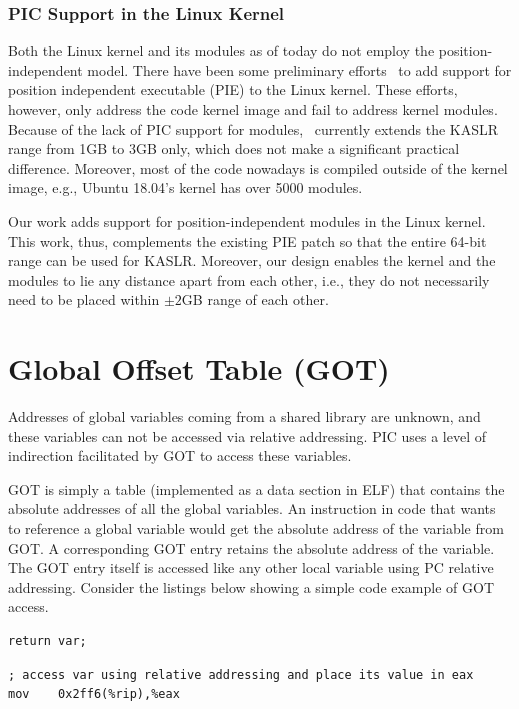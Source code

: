 \subsubsection*{PIC Support in the Linux Kernel}
Both the Linux kernel and its modules as of today do not employ the position-independent model. 
There have been some preliminary efforts~\cite{LINUXPIE} to add support for position independent executable (PIE) to the Linux kernel. These efforts, however, only address the code kernel image and fail to address kernel modules.
Because of the lack of PIC support for modules,~\cite{LINUXPIE} currently extends the KASLR range from 1GB to 3GB only, which does not make a significant practical difference.
Moreover, most of the code nowadays is compiled outside of the kernel image, e.g., Ubuntu 18.04's kernel has over 5000 modules.

Our work adds support for position-independent modules in the Linux kernel. This work, thus, complements the existing PIE patch so that the entire 64-bit range can be used for KASLR. Moreover, our design enables the kernel and the modules to lie any distance apart from each other, i.e., they do not necessarily need to be placed within $\pm 2$GB range of each other.

\section{Global Offset Table (GOT)} \label{sec:background_got}
Addresses of global variables coming from a shared library are unknown, and these variables can not be accessed via relative addressing. PIC uses a level of indirection facilitated by GOT to access these variables.

GOT is simply a table (implemented as a data section in ELF) that contains the absolute addresses of all the global variables. An instruction in code that wants to reference a global variable would get the absolute address of the variable from GOT. A corresponding GOT entry retains the absolute address of the variable. The GOT entry itself is accessed like any other local variable using PC relative addressing. Consider the listings below showing a simple code example of GOT access.
\lstset{language=C}
\begin{lstlisting}[frame=single, caption={A simple C instruction that returns a variable}]
return var;
\end{lstlisting}

\lstset{language=[x64]Assembler}
\begin{lstlisting}[frame=single, caption={Assembly Code, accessing a variable using PC relative addressing}]
; access var using relative addressing and place its value in eax
mov    0x2ff6(%rip),%eax
\end{lstlisting}

